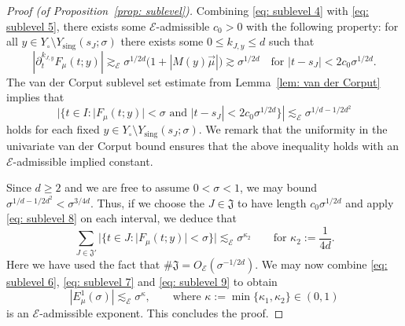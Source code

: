 \documentclass[reqno]{amsart}
\numberwithin{equation}{section}
\newcommand{\sE}{\mathscr{E}}
\newcommand{\fJ}{\mathfrak{J}}
\theoremstyle{plain}
\theoremstyle{definition}
\begin{document}
\begin{proof}[Proof (of Proposition~\ref{prop: sublevel})]
Combining \eqref{eq: sublevel 4} with \eqref{eq: sublevel 5}, there exists some $\sE$-admissible $c_0 > 0$ with the following property: for all $y \in Y_{\circ} \setminus Y_{\mathrm{sing}}(s_J;\sigma)$ there exists some $0 \leq k_{J,y} \leq d$ such that
\begin{equation*}
    |\partial_t^{k_{J,y}} F_{\mu}(t;y)| \gtrsim_{\sE} \sigma^{1/2d} \big( 1 + |M(y)\vec{\mu}|\big) \gtrsim \sigma^{1/2d} \quad \textrm{for $|t-s_J| < 2c_0 \sigma^{1/2d}$.}
\end{equation*}
The van der Corput sublevel set estimate from Lemma~\ref{lem: van der Corput} implies that 
\begin{equation}\label{eq: sublevel 8}
    |\{t \in I : |F_{\mu}(t;y)| < \sigma \textrm{ and } |t-s_J| < 2c_0 \sigma^{1/2d} \}| \lesssim_{\sE} \sigma^{1/d - 1/2d^2}
\end{equation}
holds for each fixed $y \in Y_{\circ} \setminus Y_{\mathrm{sing}}(s_J;\sigma)$. We remark that the uniformity in the univariate van der Corput bound ensures that the above inequality holds with an $\sE$-admissible implied constant. 

Since $d \geq 2$ and we are free to assume $0 < \sigma < 1$, we may bound $\sigma^{1/d - 1/2d^2} < \sigma^{3/4d}$. Thus, if we choose the $J \in \fJ$ to have length $c_0\sigma^{1/2d}$ and apply \eqref{eq: sublevel 8} on each interval, we deduce that
\begin{equation}\label{eq: sublevel 9} 
   \sum_{J \in \fJ'} |\{t \in J : |F_{\mu}(t;y)| < \sigma \}| \lesssim_{\sE} \sigma^{\kappa_2} \qquad \textrm{for $\kappa_2 := \frac{1}{4d}$.}
\end{equation}
Here we have used the fact that $\#\fJ = O_{\sE}(\sigma^{-1/2d})$. We may now combine \eqref{eq: sublevel 6}, \eqref{eq: sublevel 7} and \eqref{eq: sublevel 9} to obtain
\begin{equation*}
    |E^1_{\mu}(\sigma)| \lesssim_{\sE} \sigma^{\kappa}, \qquad \textrm{where $\kappa := \min\{\kappa_1, \kappa_2\} \in (0,1)$}
\end{equation*}
is an $\sE$-admissible exponent. This concludes the proof. 
\end{proof}



\end{document}
